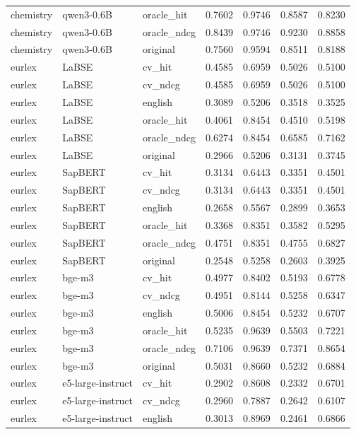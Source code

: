 \begin{tabular}{lllrrrr}
chemistry & qwen3-0.6B & oracle\_hit & 0.7602 & 0.9746 & 0.8587 & 0.8230 \\
chemistry & qwen3-0.6B & oracle\_ndcg & 0.8439 & 0.9746 & 0.9230 & 0.8858 \\
chemistry & qwen3-0.6B & original & 0.7560 & 0.9594 & 0.8511 & 0.8188 \\
eurlex & LaBSE & cv\_hit & 0.4585 & 0.6959 & 0.5026 & 0.5100 \\
eurlex & LaBSE & cv\_ndcg & 0.4585 & 0.6959 & 0.5026 & 0.5100 \\
eurlex & LaBSE & english & 0.3089 & 0.5206 & 0.3518 & 0.3525 \\
eurlex & LaBSE & oracle\_hit & 0.4061 & 0.8454 & 0.4510 & 0.5198 \\
eurlex & LaBSE & oracle\_ndcg & 0.6274 & 0.8454 & 0.6585 & 0.7162 \\
eurlex & LaBSE & original & 0.2966 & 0.5206 & 0.3131 & 0.3745 \\
eurlex & SapBERT & cv\_hit & 0.3134 & 0.6443 & 0.3351 & 0.4501 \\
eurlex & SapBERT & cv\_ndcg & 0.3134 & 0.6443 & 0.3351 & 0.4501 \\
eurlex & SapBERT & english & 0.2658 & 0.5567 & 0.2899 & 0.3653 \\
eurlex & SapBERT & oracle\_hit & 0.3368 & 0.8351 & 0.3582 & 0.5295 \\
eurlex & SapBERT & oracle\_ndcg & 0.4751 & 0.8351 & 0.4755 & 0.6827 \\
eurlex & SapBERT & original & 0.2548 & 0.5258 & 0.2603 & 0.3925 \\
eurlex & bge-m3 & cv\_hit & 0.4977 & 0.8402 & 0.5193 & 0.6778 \\
eurlex & bge-m3 & cv\_ndcg & 0.4951 & 0.8144 & 0.5258 & 0.6347 \\
eurlex & bge-m3 & english & 0.5006 & 0.8454 & 0.5232 & 0.6707 \\
eurlex & bge-m3 & oracle\_hit & 0.5235 & 0.9639 & 0.5503 & 0.7221 \\
eurlex & bge-m3 & oracle\_ndcg & 0.7106 & 0.9639 & 0.7371 & 0.8654 \\
eurlex & bge-m3 & original & 0.5031 & 0.8660 & 0.5232 & 0.6884 \\
eurlex & e5-large-instruct & cv\_hit & 0.2902 & 0.8608 & 0.2332 & 0.6701 \\
eurlex & e5-large-instruct & cv\_ndcg & 0.2960 & 0.7887 & 0.2642 & 0.6107 \\
eurlex & e5-large-instruct & english & 0.3013 & 0.8969 & 0.2461 & 0.6866 \\

\end{tabular}
